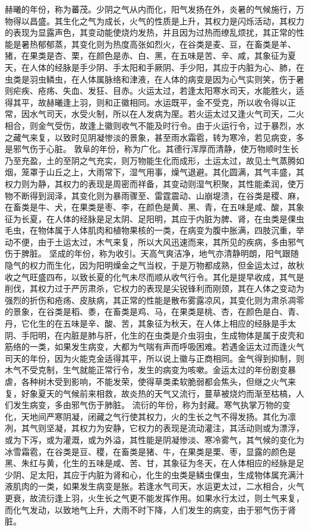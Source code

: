 \documentclass[12pt,UTF8]{ctexbook}
\begin{document}
赫曦的年份，称为蕃茂。少阴之气从内而化，阳气发扬在外，炎暑的气候施行，万物得以昌盛。其生化之气为成长，火气的性质是上升，其权力是闪烁活动，其权力的表现为显露声色，其变动能使烧灼发热，并且因为过热而缭乱烦扰，其正常的性能是暑热郁郁蒸，其变化则为热度高张如烈火，在谷类是麦、豆，在畜类是羊、猪，在果类是杏、栗，在颜色是赤、白、黑，在五味是苦、辛、咸，其象征为夏天，在人体的经脉是手少阴、手太阳和手厥阴、手少阳，其应于内脏为心、肺，在虫类是羽虫鳞虫，在人体属脉络和津液，在人体的病变是因为心气实则笑，伤于暑则疟疾、疮疡、失血、发狂、目赤。火运太过，若逢太阳寒水司天，水能胜火，适得其平，故赫曦逢上羽，则和正徽相同。水运既平，金不受克，所以收令得以正常，因水气司天，水受火制，所以在人发病为厔。若火运太过又逢火气司天，二火相合，则金气受伤，故逢上徽则收气不能及时行令。由于火运行令，过于暴烈，水之藏气来复，以致时见阴凝惨淡的景象，甚至雨水霜雹，转为寒冷，若见病变，多是邪气伤于心脏。
敦阜的年份，称为广化。其德行浑厚而清静，使万物顺时生长乃至充盈，土的至阴之气充实，则万物能生化而成形，土运太过，故见土气蒸腾如烟，笼罩于山丘之上，大雨常下，湿气用事，燥气退避。其化圆满，其气丰盛，其权力则为静，其权力的表现是周密而祥备，其变动则湿气积聚，其性能柔润，使万物不断得到润泽，其变化则为暴雨骤至、雷霆震动、山崩堤溃，在谷类是稷、麻，在畜类是牛、犬，在果类是枣、李，在颜色是黄、黑、青，在五味是咸、酸，其象征为长夏，在人体的经脉是足太阴、足阳明，其应于内脏为脾、肾，在虫类是倮虫毛虫，在物体属于人体肌肉和植物果核的一类，在病变为腹中胀满，四肢沉重，举动不便，由于土运太过，木气来复，所以大风迅速而来，其所见的疾病，多由邪气伤于脾脏。
坚成的年份，称为收引。天高气爽洁净，地气亦清静明朗，阳气跟随隐气的权力而生化，因为阳明燥金之气当权，于是万物都成熟，但金运太过，故秋收之气旺盛四布，以致长夏的化气未尽而顺从收气行令。其化是提早收成，其气是削伐，其权力过于严厉肃杀，它权力的表现是尖锐锋利而刚颈，其在人体之变动为强烈的折伤和疮疡、皮肤病，其正常的性能是散布雾露凉风，其变化则为肃杀凋零的景象，在谷类是稻、黍，在畜类是鸡、马，在果类是桃、杏，在颜色是白、青、丹，它化生的在五味是辛、酸、苦，其象征为秋天，在人体上相应的经脉是手太阴、手阳明，在内脏是肺与肝，化生的在虫类是介虫羽虫，生成物体是属于皮壳和筋络的一类，如果发生病变，大都为气喘有声而呼吸困难。若遇金运太过而逢火气司天的年份，因为火能克金适得其平，所以说上徽与正商相同。金气得到抑制，则木气不受克制，生气就能正常行令，发生的病变为咳嗽。金运太过的年份剧变暴虐，各种树木受到影响，不能发荣，使得草类柔软脆弱都会焦头，但继之火气来复，好象夏天的气候前来相救，故炎热的天气又流行，蔓草被烧灼而渐至枯槁，人们发生病变，多由邪气伤于肺脏。
流衍的年份，称为封藏。寒气执掌万物的变化，天地间严寒阴凝，闭藏之气行使其权力，火的生长之气不得发扬。其化为凛冽，其气则坚凝，其权力为安静，它权力的表现是流动灌注，其活动则或为漂浮，或为下泻，或为灌溉，或为外溢，其性能是阴凝惨淡、寒冷雾气，其气候的变化为冰雪霜雹，在谷类是豆、稷，在畜类是猪、牛，在果类是栗、枣，显露的颜色是黑、朱红与黄，化生的五味是咸、苦、甘，其象征为冬天，在人体相应的经脉是足少阴、足太阳，其应于内脏为肾和心，化生的虫类是鳞虫倮虫，生成物体属充满汁液肌肉的一类，如果发生病变是胀。若逢水气司天，水运更太过，二水相合，火气更衰，故流衍逢上羽，火生长之气更不能发挥作用。如果水行太过，则土气来复，而化气发动，以致地气上升，大雨不时下降，人们发生的病变，由于邪气伤于肾脏。
\end{document}
